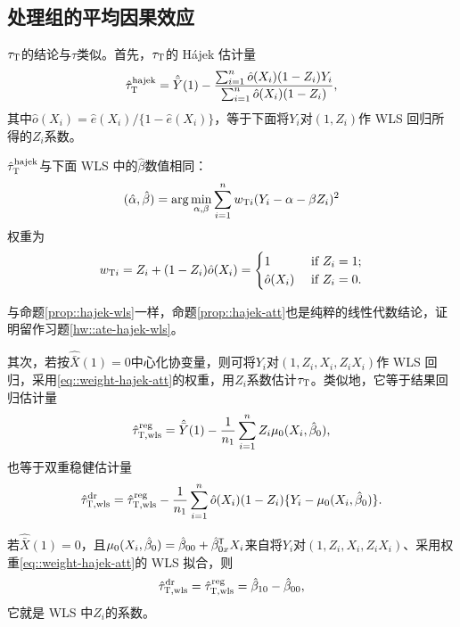 \subsection{处理组的平均因果效应}

$\tau_\textsc{T}$的结论与$\tau$类似。首先，$\tau_\textsc{T}$的 Hájek 估计量
$$
\hat{\tau}_\textsc{T}^\text{hajek} = \hat{\bar{Y}}(1) 
- \frac{  \sum_{i=1}^n \hat{o}(X_i) (1-Z_i) Y_i }{ \sum_{i=1}^n \hat{o}(X_i) (1-Z_i) } ,
$$
其中$\hat{o}(X_i) = \hat{e}(X_i) / \{ 1- \hat{e}(X_i) \}$，等于下面将$Y_i$对$(1,Z_i)$作 WLS 回归所得的$Z_i$系数。


\begin{proposition}
\label{prop::hajek-att}
$\hat\tau_\textsc{T}^{\text{hajek}}$与下面 WLS 中的$\hat{\beta}$数值相同：
$$
(\hat{\alpha}, \hat{\beta}) = \arg\min_{\alpha, \beta} \sum_{i=1}^n  w_{\textsc{T}i}  (Y_i - \alpha - \beta Z_i)^2
$$
权重为
\begin{eqnarray}\label{eq::weight-hajek-att}
w_{\textsc{T}i} = Z_i +(1-Z_i )  \hat{o}(X_i)
= 
\begin{cases}
1 & \text{ if } Z_i=1;\\
 \hat{o}(X_i)   & \text{ if } Z_i=0.
\end{cases} 
\end{eqnarray}
\end{proposition}

与命题\ref{prop::hajek-wls}一样，命题\ref{prop::hajek-att}也是纯粹的线性代数结论，证明留作习题\ref{hw::ate-hajek-wls}。 


其次，若按$\hat{\bar{X}}(1) = 0$中心化协变量，则可将$Y_i$对$(1,Z_i, X_i, Z_iX_i)$作 WLS 回归，采用\eqref{eq::weight-hajek-att}的权重，用$Z_i$系数估计$\tau_\textsc{T}$。类似地，它等于结果回归估计量
$$
\hat{\tau}_{\textsc{T},\text{wls}}^\text{reg} = \hat{\bar{Y}}(1) - \frac{1}{n_1} \sum_{i=1}^n Z_i \mu_0(X_i, \hat{\beta}_0),
$$
也等于双重稳健估计量
$$
\hat{\tau}_{\textsc{T},\text{wls}}^\text{dr} =\hat{\tau}_{\textsc{T},\text{wls}}^\text{reg} 
- \frac{1}{n_1} \sum_{i=1}^n  \hat{o}(X_i)  (1-Z_i) \{  Y_i- \mu_0(X_i, \hat{\beta}_0) \} .
$$

\begin{theorem}
\label{thm::numerical-equivalence-wls-dr-att}
若$\hat{\bar{X}}(1) = 0$，且$ \mu_0(X_i, \hat{\beta}_0) =  \hat \beta_{00} +   \hat\beta_{0x}^{\mkern-1.5mu\mathsf{T}} X_i$来自将$Y_i$对$(1,Z_i, X_i, Z_iX_i)$、采用权重\eqref{eq::weight-hajek-att}的 WLS 拟合，则
$$
\hat{\tau}_{\textsc{T},\textup{wls}}^\textup{dr}  = \hat{\tau}_{\textsc{T},\textup{wls}}^\textup{reg} 
= \hat \beta_{10} - \hat \beta_{00} ,
$$
它就是 WLS 中$Z_i$的系数。 
\end{theorem}


